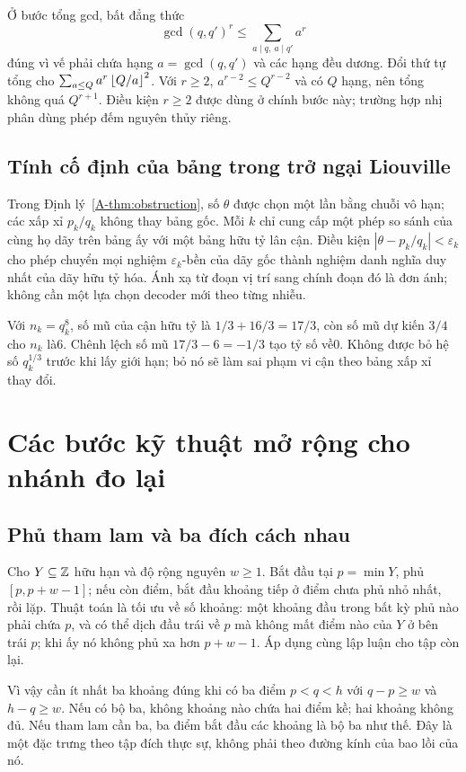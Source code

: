 Ở bước tổng gcd, bất đẳng thức
\[
\gcd(q,q')^r\le\sum_{a\mid q,\ a\mid q'}a^r
\]
đúng vì vế phải chứa hạng $a=\gcd(q,q')$ và các hạng đều dương. Đổi thứ tự tổng cho $\sum_{a\le Q}a^r\left\lfloor Q/a\right\rfloor^2$. Với $r\ge2$, $a^{r-2}\le Q^{r-2}$ và có $Q$ hạng, nên tổng không quá $Q^{r+1}$. Điều kiện $r\ge2$ được dùng ở chính bước này; trường hợp nhị phân dùng phép đếm nguyên thủy riêng.

\subsection{Tính cố định của bảng trong trở ngại Liouville}
Trong Định lý~\ref{A-thm:obstruction}, số $\theta$ được chọn một lần bằng chuỗi vô hạn; các xấp xỉ $p_k/q_k$ không thay bảng gốc. Mỗi $k$ chỉ cung cấp một phép so sánh của cùng họ dãy trên bảng ấy với một bảng hữu tỷ lân cận. Điều kiện $|\theta-p_k/q_k|<\varepsilon_k$ cho phép chuyển mọi nghiệm $\varepsilon_k$-bền của dãy gốc thành nghiệm danh nghĩa duy nhất của dãy hữu tỷ hóa. Ánh xạ từ đoạn vị trí sang chính đoạn đó là đơn ánh; không cần một lựa chọn decoder mới theo từng nhiễu.

Với $n_k=q_k^8$, số mũ của cận hữu tỷ là $1/3+16/3=17/3$, còn số mũ dự kiến $3/4$ cho $n_k$ là6. Chênh lệch số mũ $17/3-6=-1/3$ tạo tỷ số về0. Không được bỏ hệ số $q_k^{1/3}$ trước khi lấy giới hạn; bỏ nó sẽ làm sai phạm vi cận theo bảng xấp xỉ thay đổi.

\section{Các bước kỹ thuật mở rộng cho nhánh đo lại}\label{app:timingproof}
\subsection{Phủ tham lam và ba đích cách nhau}
Cho $Y\subseteq\mathbb Z$ hữu hạn và độ rộng nguyên $w\ge1$. Bắt đầu tại $p=\min Y$, phủ $[p,p+w-1]$; nếu còn điểm, bắt đầu khoảng tiếp ở điểm chưa phủ nhỏ nhất, rồi lặp. Thuật toán là tối ưu về số khoảng: một khoảng đầu trong bất kỳ phủ nào phải chứa $p$, và có thể dịch đầu trái về $p$ mà không mất điểm nào của $Y$ ở bên trái $p$; khi ấy nó không phủ xa hơn $p+w-1$. Áp dụng cùng lập luận cho tập còn lại.

Vì vậy cần ít nhất ba khoảng đúng khi có ba điểm $p<q<h$ với $q-p\ge w$ và $h-q\ge w$. Nếu có bộ ba, không khoảng nào chứa hai điểm kề; hai khoảng không đủ. Nếu tham lam cần ba, ba điểm bắt đầu các khoảng là bộ ba như thế. Đây là một đặc trưng theo tập đích thực sự, không phải theo đường kính của bao lồi của nó.

